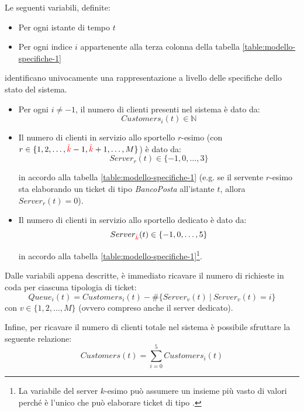 Le seguenti variabili, definite:
\begin{itemize}
\item Per ogni istante di tempo $t$
\item Per ogni indice $i$ appartenente alla terza colonna della tabella \ref{table:modello-specifiche-1}
\end{itemize}
identificano univocamente una rappresentazione a livello delle specifiche dello stato del sistema.
\begin{itemize}
\item Per ogni $i \neq -1$, il numero di clienti presenti nel sistema è dato da:
\begin{equation}
Customers_i(t) \in \mathbb{N}
\end{equation}
\item Il numero di clienti in servizio allo sportello $r$-esimo (con $r \in \lbrace 1, 2, \dots, {\color{red}\hat{k}}-1, {\color{red}\hat{k}}+1, \dots, M \rbrace$) è dato da:
\begin{equation}
Server_r(t) \in \lbrace -1, 0, \dots, 3 \rbrace
\end{equation}

in accordo alla tabella \ref{table:modello-specifiche-1} (e.g. se il servente $r$-esimo sta elaborando un ticket di tipo \uo{} \textsl{BancoPosta} all'istante $t$, allora $Server_r(t)=0$).
\item Il numero di clienti in servizio allo sportello dedicato è dato da:
\begin{equation}
Server_{\color{red}\hat{k}}(t) \in \lbrace -1, 0, \dots, 5 \rbrace
\end{equation}

in accordo alla tabella \ref{table:modello-specifiche-1}\footnote{La variabile del server $k$-esimo può assumere un insieme più vasto di valori perché è l'unico che può elaborare ticket di tipo \sr{}.}.
\end{itemize}

Dalle variabili appena descritte, è immediato ricavare il numero di richieste in coda per ciascuna tipologia di ticket:
\begin{equation}
Queue_i(t) = Customers_i(t) - \# \lbrace Server_v(t)\ \vert\ Server_v(t) = i \rbrace
\end{equation}
con $v \in \lbrace 1, 2, \dots, M \rbrace$ (ovvero compreso anche il server dedicato).

Infine, per ricavare il numero di clienti totale nel sistema è possibile sfruttare la seguente relazione:
\begin{equation}
Customers(t) = \sum_{i=0}^{5} Customers_i(t)
\end{equation}

